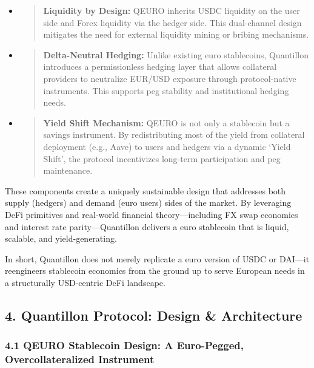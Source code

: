 \begin{itemize}
\item
  \begin{quote}
  \textbf{Liquidity by Design:} QEURO inherits USDC liquidity on the
  user side and Forex liquidity via the hedger side. This dual-channel
  design mitigates the need for external liquidity mining or bribing
  mechanisms.
  \end{quote}
\item
  \begin{quote}
  \textbf{Delta-Neutral Hedging:} Unlike existing euro stablecoins,
  Quantillon introduces a permissionless hedging layer that allows
  collateral providers to neutralize EUR/USD exposure through
  protocol-native instruments. This supports peg stability and
  institutional hedging needs.
  \end{quote}
\item
  \begin{quote}
  \textbf{Yield Shift Mechanism:} QEURO is not only a stablecoin but a
  savings instrument. By redistributing most of the yield from
  collateral deployment (e.g., Aave) to users and hedgers via a dynamic
  `Yield Shift', the protocol incentivizes long-term participation and
  peg maintenance.
  \end{quote}
\end{itemize}

These components create a uniquely sustainable design that addresses
both supply (hedgers) and demand (euro users) sides of the market. By
leveraging DeFi primitives and real-world financial theory---including
FX swap economics and interest rate parity---Quantillon delivers a euro
stablecoin that is liquid, scalable, and yield-generating.

In short, Quantillon does not merely replicate a euro version of USDC or
DAI---it reengineers stablecoin economics from the ground up to serve
European needs in a structurally USD-centric DeFi landscape.

\hypertarget{quantillon-protocol-design-architecture}{%
\subsection{4. Quantillon Protocol: Design \&
Architecture}\label{quantillon-protocol-design-architecture}}

\hypertarget{qeuro-stablecoin-design-a-euro-pegged-overcollateralized-instrument}{%
\subsubsection{4.1 QEURO Stablecoin Design: A Euro-Pegged,
Overcollateralized
Instrument}\label{qeuro-stablecoin-design-a-euro-pegged-overcollateralized-instrument}}

